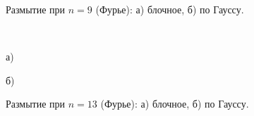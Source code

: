 \documentclass[a5paper, 10pt]{article}
\theoremstyle{definition}
\theoremstyle{plain}
\theoremstyle{remark}
\begin{document}
\begin{figure}[h!]
\begin{minipage}[h!]{0.47\linewidth}
\end{minipage}
\caption{Размытие при $n= 9$ (Фурье): а) блочное, б) по Гауссу.}
\,
\vfill
\begin{minipage}[h!]{0.47\linewidth}
 а) \\
\end{minipage}
\hfill
\begin{minipage}[h!]{0.47\linewidth}
 б) \\
\end{minipage}
\caption{Размытие при $n= 13$ (Фурье): а) блочное, б) по Гауссу.}
\end{figure}
\end{document}

